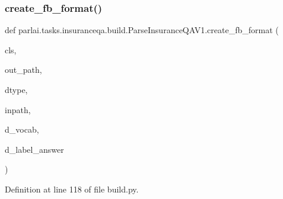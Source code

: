 \subsubsection{\texorpdfstring{create\+\_\+fb\+\_\+format()}{create\_fb\_format()}}
{\footnotesize\ttfamily def parlai.\+tasks.\+insuranceqa.\+build.\+Parse\+Insurance\+Q\+A\+V1.\+create\+\_\+fb\+\_\+format (\begin{DoxyParamCaption}\item[{}]{cls,  }\item[{}]{out\+\_\+path,  }\item[{}]{dtype,  }\item[{}]{inpath,  }\item[{}]{d\+\_\+vocab,  }\item[{}]{d\+\_\+label\+\_\+answer }\end{DoxyParamCaption})}



Definition at line 118 of file build.\+py.


